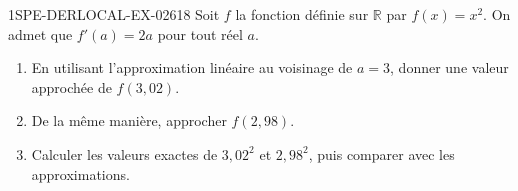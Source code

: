 \begin{exercice}{1SPE-DERLOCAL-EX-026}{1}{8}
Soit $f$ la fonction définie sur $\mathbb{R}$ par $f(x) = x^2$. On admet que $f'(a) = 2a$ pour tout réel $a$.

\begin{enumerate}
  \item En utilisant l'approximation linéaire au voisinage de $a = 3$, donner une valeur approchée de $f(3{,}02)$.
  \item De la même manière, approcher $f(2{,}98)$.
  \item Calculer les valeurs exactes de $3{,}02^2$ et $2{,}98^2$, puis comparer avec les approximations.
\end{enumerate}
\end{exercice}

